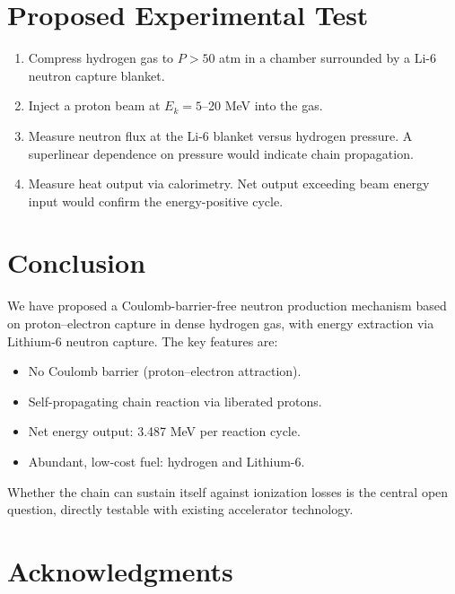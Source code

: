 \documentclass[12pt,a4paper]{article}
\begin{document}
\section{Proposed Experimental Test}

\begin{enumerate}

  \item Compress hydrogen gas to $P > 50$ atm in a chamber
    surrounded by a Li-6 neutron capture blanket.

  \item Inject a proton beam at $E_k = 5$--20 MeV into the gas.

  \item Measure neutron flux at the Li-6 blanket versus hydrogen
    pressure. A superlinear dependence on pressure would indicate
    chain propagation.

  \item Measure heat output via calorimetry. Net output exceeding
    beam energy input would confirm the energy-positive cycle.

\end{enumerate}

\section{Conclusion}

We have proposed a Coulomb-barrier-free neutron production mechanism
based on proton--electron capture in dense hydrogen gas, with energy
extraction via Lithium-6 neutron capture. The key features are:

\begin{itemize}
  \item No Coulomb barrier (proton--electron attraction).
  \item Self-propagating chain reaction via liberated protons.
  \item Net energy output: 3.487 MeV per reaction cycle.
  \item Abundant, low-cost fuel: hydrogen and Lithium-6.
\end{itemize}

Whether the chain can sustain itself against ionization losses is
the central open question, directly testable with existing
accelerator technology.

\section*{Acknowledgments}
\end{document}
